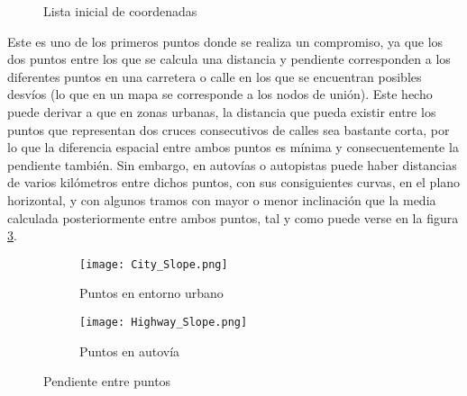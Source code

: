 \documentclass[11pt,spanish,listoffigures,listoftables]{tfgetsinf}
\begin{document}
\begin{figure}[ht]
\centering
{}
\caption{Lista inicial de coordenadas}
\end{figure}

Este es uno de los primeros puntos donde se realiza un compromiso, ya que los dos puntos entre los que se calcula una distancia y pendiente corresponden a los diferentes puntos en una carretera o calle en los que se encuentran posibles desvíos (lo que en un mapa se corresponde a los nodos de unión). Este hecho puede derivar a que en zonas urbanas, la distancia que pueda existir entre los puntos que representan dos cruces consecutivos de calles sea bastante corta, por lo que la diferencia espacial entre ambos puntos es mínima y consecuentemente la pendiente también. Sin embargo, en autovías o autopistas puede haber distancias de varios kilómetros entre dichos puntos, con sus consiguientes curvas, en el plano horizontal, y con algunos tramos con mayor o menor inclinación que la media calculada posteriormente entre ambos puntos, tal y como puede verse en la figura \ref{fig:figSlopes}.

\begin{figure}[ht]
    \begin{subfigure}[b]{0.5\linewidth}
        \centering
        \texttt{[image: City\_Slope.png]}
        \label{fig:figCitySlope}
        \caption{Puntos en entorno urbano}
    \end{subfigure}
    \begin{subfigure}[b]{0.5\linewidth}
        \centering
        \texttt{[image: Highway\_Slope.png]} 
        \label{fig:figHighwaySlope}
        \caption{Puntos en autovía}
    \end{subfigure}
    \caption{Pendiente entre puntos}
    \label{fig:figSlopes}
\end{figure}
\end{document}
